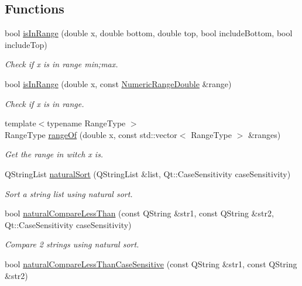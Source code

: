 \subsection*{Functions}
\begin{DoxyCompactItemize}
\item 
bool \hyperlink{namespacemdt_algorithms_ab992c2e3ca601b25322e817d4cb6f8c0}{is\-In\-Range} (double x, double bottom, double top, bool include\-Bottom, bool include\-Top)
\begin{DoxyCompactList}\small\item\em Check if x is in range min;max. \end{DoxyCompactList}\item 
bool \hyperlink{namespacemdt_algorithms_aeef08bc2e48a3a24a65e30d2685fbc9a}{is\-In\-Range} (double x, const \hyperlink{structmdt_algorithms_1_1_numeric_range_double}{Numeric\-Range\-Double} \&range)
\begin{DoxyCompactList}\small\item\em Check if x is in range. \end{DoxyCompactList}\item 
{\footnotesize template$<$typename Range\-Type $>$ }\\Range\-Type \hyperlink{namespacemdt_algorithms_a8d3b78c6e483ab34e49e646909618655}{range\-Of} (double x, const std\-::vector$<$ Range\-Type $>$ \&ranges)
\begin{DoxyCompactList}\small\item\em Get the range in witch x is. \end{DoxyCompactList}\item 
Q\-String\-List \hyperlink{namespacemdt_algorithms_a32a09ec3855b605b6e455ea418502aeb}{natural\-Sort} (Q\-String\-List \&list, Qt\-::\-Case\-Sensitivity case\-Sensitivity)
\begin{DoxyCompactList}\small\item\em Sort a string list using natural sort. \end{DoxyCompactList}\item 
bool \hyperlink{namespacemdt_algorithms_af22a54e83499afe31d22fac9bc521c54}{natural\-Compare\-Less\-Than} (const Q\-String \&str1, const Q\-String \&str2, Qt\-::\-Case\-Sensitivity case\-Sensitivity)
\begin{DoxyCompactList}\small\item\em Compare 2 strings using natural sort. \end{DoxyCompactList}\item 
bool \hyperlink{namespacemdt_algorithms_aa5af30feb9cfecb2971d6ae90c9c5fdf}{natural\-Compare\-Less\-Than\-Case\-Sensitive} (const Q\-String \&str1, const Q\-String \&str2)

\end{DoxyCompactItemize}
